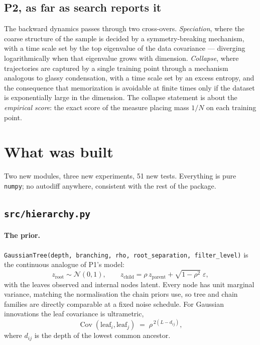 \documentclass[11pt]{article}
\theoremstyle{remark}
\newcommand{\Cov}{\operatorname{Cov}}
\newcommand{\code}[1]{\texttt{\small #1}}
\begin{document}
\subsection{P2, as far as search reports it}

The backward dynamics passes through two cross-overs. \emph{Speciation}, where
the coarse structure of the sample is decided by a symmetry-breaking mechanism,
with a time scale set by the top eigenvalue of the data covariance --- diverging
logarithmically when that eigenvalue grows with dimension. \emph{Collapse},
where trajectories are captured by a single training point through a mechanism
analogous to glassy condensation, with a time scale set by an excess entropy,
and the consequence that memorization is avoidable at finite times only if the
dataset is exponentially large in the dimension. The collapse statement is about
the \emph{empirical score}: the exact score of the measure placing mass $1/N$ on
each training point.

\section{What was built}
\label{sec:machinery}

Two new modules, three new experiments, 51 new tests. Everything is pure
\code{numpy}; no autodiff anywhere, consistent with the rest of the package.

\subsection{\code{src/hierarchy.py}}

\paragraph{The prior.} \code{GaussianTree(depth, branching, rho,
root\_separation, filter\_level)} is the continuous analogue of P1's model:
\begin{equation}
  z_{\text{root}} \sim \mathcal N(0,1), \qquad
  z_{\text{child}} = \rho\, z_{\text{parent}} + \sqrt{1-\rho^2}\;\varepsilon,
\end{equation}
with the leaves observed and internal nodes latent. Every node has unit marginal
variance, matching the normalisation the chain priors use, so tree and chain
families are directly comparable at a fixed noise schedule. For Gaussian
innovations the leaf covariance is ultrametric,
\begin{equation}
  \Cov(\text{leaf}_i,\text{leaf}_j) \;=\; \rho^{\,2(L - d_{ij})},
\end{equation}
where $d_{ij}$ is the depth of the lowest common ancestor.
\end{document}

